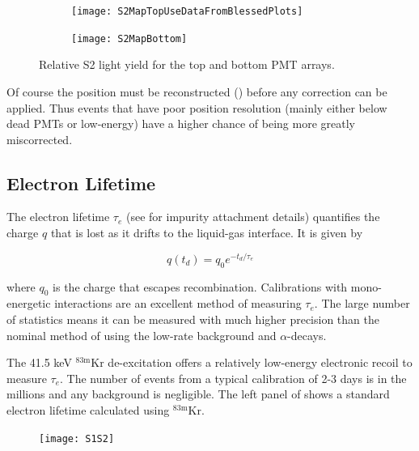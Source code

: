 \begin{figure}
    \centering
    \begin{subfigure}[t]{0.45\textwidth}
        \centering
        \texttt{[image: S2MapTopUseDataFromBlessedPlots]}
    \end{subfigure}%
    \begin{subfigure}[t]{0.45\textwidth}
        \centering
        \texttt{[image: S2MapBottom]}
    \end{subfigure}
    \caption{Relative S2 light yield for the top and bottom PMT arrays.}
	\label{fig:calibrations_s2_maps}
\end{figure}

Of course the position must be reconstructed () before any correction can be
applied.  Thus events that have poor position resolution (mainly either below dead PMTs or low-energy) have a higher chance of being
more greatly miscorrected.



\subsection{Electron Lifetime}
\label{subsec:det_char_elifetime}
The electron lifetime $\tau_e$ (see  for impurity attachment details) quantifies the charge $q$ that
is lost as it drifts to the liquid-gas interface.  It is given by

\begin{equation}
q(t_d) = q_0 e^{-t_d / \tau_e}
\label{eq:det_char_elifetime}
\end{equation}

where $q_0$ is the charge that escapes recombination.  Calibrations with mono-energetic interactions are an excellent method of
measuring $\tau_e$.  The large number of statistics means it can be measured with much higher precision than the
nominal method of using the low-rate background  and  $\alpha$-decays.

The 41.5 keV $\mathrm{^{83m}Kr}$ de-excitation offers a relatively low-energy electronic recoil to measure $\tau_e$.  The number of events
from a typical calibration of 2-3 days is in the millions and any background is negligible.  The left panel of
 shows a standard electron lifetime calculated using $\mathrm{^{83m}Kr}$.

\begin{figure}
\centering
\texttt{[image: S1S2]}
\label{fig:calibrations_kr_s1_s2}
\end{figure}

